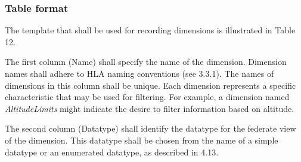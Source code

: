 \subsubsection{Table format}
The template that shall be used for recording dimensions is illustrated in Table 12.

\vspace{-7pt}
\begingroup
\fontsize{9}{10.9}\selectfont
\setlength{\tabcolsep}{3pt}
\renewcommand{\arraystretch}{1.32}
\noindent{}
\endgroup\vspace{7.1pt}

The first column (Name) shall specify the name of the dimension. Dimension names shall adhere to HLA naming conventions (see 3.3.1). The names of dimensions in this column shall be unique. Each dimension represents a specific characteristic that may be used for filtering. For example, a dimension named \textit{AltitudeLimits} might indicate the desire to filter information based on altitude.

The second column (Datatype) shall identify the datatype for the federate view of the dimension. This datatype shall be chosen from the name of a simple datatype or an enumerated datatype, as described in 4.13.

